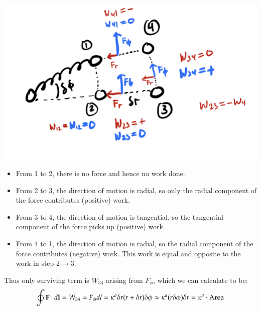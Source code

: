 \begin{center}
    \includegraphics[scale=0.5]{Lectures/Images/lec3-noncentralspringwork.png}
\end{center}

\begin{itemize}
    \item From 1 to 2, there is no force and hence no work done.
    \item From 2 to 3, the direction of motion is radial, so only the radial component of the force contributes (positive) work.
    \item From 3 to 4, the direction of motion is tangential, so the tangential component of the force picks up (positive) work.
    \item From 4 to 1, the direction of motion is radial, so the radial component of the force contributes (negative) work. This work is equal and opposite to the work in step 2$\to$3.
\end{itemize}

Thus only surviving term is $W_{34}$ arising from $F_\phi$, which we can calculate to be:
\begin{equation}
    \oint \mathbf{F} \cdot d\mathbf{l} = W_{34} = F_\phi dl = \kappa^a \delta r (r + \delta r)\delta \phi \approx \kappa^a (r\delta \phi)\delta r = \kappa^a \cdot \text{Area}
\end{equation}

